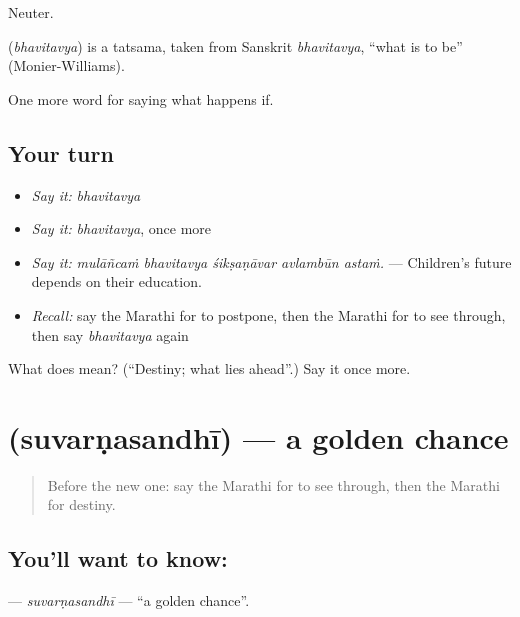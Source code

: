 Neuter.

\begin{cousinweb}
\textbf{} (\emph{bhavitavya}) is a tatsama, taken from Sanskrit \emph{bhavitavya}, \textquotedblleft{}what is to be\textquotedblright{} (Monier-Williams).
\end{cousinweb}

\begin{grammarlens}[title={What you've built}]
One more word for saying what happens if.
\end{grammarlens}

\subsection*{Your turn}
\begin{itemize}
\raggedright
  \item \emph{Say it:} \emph{bhavitavya}
  \item \emph{Say it:} \emph{bhavitavya}, once more
  \item \emph{Say it:} \emph{mulāñcaṁ bhavitavya śikṣaṇāvar avlambūn astaṁ.} — Children's future depends on their education.
  \item \emph{Recall:} say the Marathi for to postpone, then the Marathi for to see through, then say \emph{bhavitavya} again
\end{itemize}

\begin{tcolorbox}[breakable,colback=teal!4,colframe=teal!35!black,title={Before you move on}]
What does  mean? (\textquotedblleft{}Destiny; what lies ahead\textquotedblright{}.) Say it once more.
\end{tcolorbox}
\section[\texorpdfstring{\mr{सुवर्णसंधी} (suvarṇasandhī)}{सुवर्णसंधी (suvarṇasandhī)}]{ (suvarṇasandhī) — a golden chance}

\label{lesson:MR-C545-suvarnasandhi}



\begin{quote}
Before the new one: say the Marathi for to see through, then the Marathi for destiny.
\end{quote}

\subsection*{You'll want to know: }
\textbf{} — \emph{suvarṇasandhī} — \textquotedblleft{}a golden chance\textquotedblright{}.

